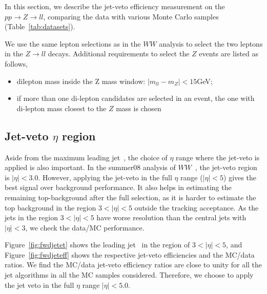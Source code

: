 In this section, we describe the jet-veto efficiency measurement on 
the $pp\to Z\to ll$, comparing the data with various Monte Carlo samples 
(Table~\ref{tab:datasets}). 

We use the same lepton selections as in the $WW$ analysis to select the 
two leptons in the $Z\to ll$ decays. 
Additional requirements to select the $Z$ events are listed as follows,
\begin{itemize}
\item dilepton mass inside the Z mass window: $|m_{ll} - m_Z|<15$GeV;
\item if more than one di-lepton candidates are selected in an event, the 
one with di-lepton mass closest to the $Z$ mass is chosen
\end{itemize}

\subsection {Jet-veto $\eta$ region}

Aside from the maximum leading jet \pt\,, the choice of $\eta$ range where 
the jet-veto is applied is also important. 
In the summer08 analysis of $WW$~\cite{wwanalysis}, 
the jet-veto region is $|\eta|<3.0$. 
However, applying the jet-veto in the full $\eta$ 
range ($|\eta|<5$) gives the best signal over background performance. 
It also helps in estimating the remaining top-background after 
the full selection, as it is harder to estimate the top background 
in the region $3<|\eta|<5$ outside the tracking acceptance. 
As the jets in the region $3<|\eta|<5$ have worse resolution 
than the central jets with $|\eta|<3$, we check the data/MC performance.

Figure~\ref{fig:fwdjetet} shows the leading jet \pt\, in the 
region of $3<|\eta|<5$, and Figure~\ref{fig:fwdjeteff} 
shows the respective jet-veto efficiencies and the MC/data ratios. 
We find the MC/data jet-veto efficiency ratios are close to unity 
for all the jet algorithms in all the MC samples considered.
Therefore, we choose to apply the jet veto in the full 
$\eta$ range $|\eta|<5.0$.


